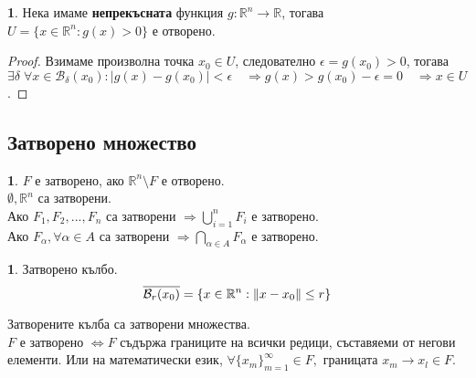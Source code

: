 \documentclass[11pt]{article}
\numberwithin{equation}{section}
\numberwithin{figure}{section}
\numberwithin{table}{section}
\theoremstyle{plain}
\theoremstyle{definition}
\newtheorem{defn}[thm]{\protect\definitionname}
\theoremstyle{remark}
\theoremstyle{definition}
\theoremstyle{remark}
\theoremstyle{plain}
\theoremstyle{definition}
\newtheorem*{defn*}{\protect\definitionname}
\theoremstyle{definition}
\newtheorem{example}[thm]{\protect\examplename}
\theoremstyle{plain}
\theoremstyle{plain}
\theoremstyle{plain}
\theoremstyle{definition}
\theoremstyle{plain}
\providecommand{\definitionname}{Дефиниция}
\providecommand{\examplename}{Пример}
\DeclarePairedDelimiter\norm{\lVert}{\rVert}
\newcommand*{\B}{\mathcal{B}}
\newcommand*{\R}{\mathbb{R}}
\begin{document}
\begin{example}
Нека имаме \textbf{непрекъсната} функция $g:\R^n \rightarrow \R$, тогава $U = \{x\in\R^n:g(x)>0\}$ е отворено.
\begin{proof}
Взимаме произволна точка $x_0\in U$, следователно $\epsilon = g(x_0)>0$, тогава $\exists \delta \; \forall x\in\B_\delta(x_0): |g(x)-g(x_0)|<\epsilon \quad \Rightarrow g(x)>g(x_0)-\epsilon = 0 \quad \Rightarrow x \in U$.
\end{proof}
\end{example}

\subsection{Затворено множество}

\begin{defn}
$F$ е затворено, ако $\R^n \setminus F$ е отворено.\\
$\emptyset, \R^n$ са затворени.\\
Ако $F_1, F_2, ..., F_n$ са затворени $\Rightarrow \bigcup_{i=1}^n F_i$ е затворено.\\
Ако $F_\alpha, \forall \alpha \in A$ са затворени $\Rightarrow \bigcap _{\alpha \in A} F_\alpha$ е затворено.
\end{defn}

\begin{defn*}
Затворено кълбо.
$$\overline{\B_r(x_0)} = \{x \in \R^n : \norm{x-x_0}\leq r \}$$
\end{defn*}

\noindent Затворените кълба са затворени множества.\\
$F$ е затворено $\iff F$ съдържа границите на всички редици, съставяеми от негови елементи. Или на математически език, $\forall \{x_m\}_{m=1}^\infty \in F, $ границата $x_m \rightarrow x_l \in F$.
\end{document}

